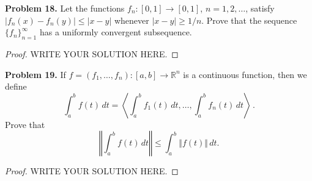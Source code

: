 \documentclass[12pt]{article}
\theoremstyle{definition}
\theoremstyle{definition}
\numberwithin{equation}{subsection}
\begin{document}
\medskip

\noindent
{\bf Problem 18.}
Let the functions $f_n:[0,1]\to [0,1]$, $n=1,2,\ldots$,
satisfy $|f_n(x)-f_n(y)|\leq |x-y|$ whenever $|x-y|\geq 1/n$.
Prove that the sequence $\{ f_n\}_{n=1}^\infty$ has a uniformly
convergent subsequence.
\begin{proof}
WRITE YOUR SOLUTION HERE.
\end{proof}

\medskip

\noindent
{\bf Problem 19.}
If $f=(f_1,\ldots,f_n):[a,b]\to \mathbb{R}^n$ is a
continuous function, then we define
$$
\int_a^b f(t)\, dt =
\left\langle \int_a^b f_1(t)\, dt, \ldots, \int_a^b f_n(t)\, dt \right\rangle\, .
$$
Prove that
$$
\left\Vert \int_a^b f(t)\, dt \right\Vert \leq
\int_a^b \Vert f(t)\Vert\, dt.
$$
\begin{proof}
WRITE YOUR SOLUTION HERE.
\end{proof}
\end{document}
